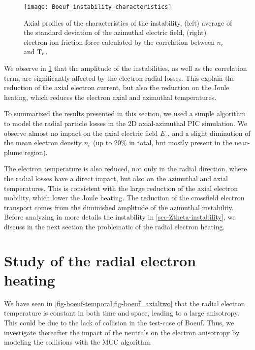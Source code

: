   \begin{figure}[!hbt]
    \centering
    \texttt{[image: Boeuf\_instability\_characteristics]}
    \caption{Axial profiles of the characteristics of the instability, (left) average of the standard deviation of the azimuthal electric field, (right) electron-ion friction force calculated by the correlation between $n_e$ and $\mathrm{T_e}$.    }
    \label{fig-boeuf-instability}
  \end{figure}

  
  We observe in \cref{fig-boeuf-instability} that the amplitude of the instabilities, as well as the correlation term, are significantly affected by the electron radial losses.
  This explain the reduction of the axial electron current, but also the reduction on the Joule heating, which reduces the electron axial and azimuthal temperatures.

  \vspace{1em}
  To summarized the results presented in this section, we used a simple algorithm to model the radial particle losses in the \ac{2D} axial-azimuthal \ac{PIC} simulation.
  We observe almost no impact on the axial electric field $E_z$, and a slight diminution of the mean electron density $n_e$ (up to 20\% in total, but mostly present in the near-plume region).
  
  The electron temperature is also reduced, not only in the radial direction, where the radial losses have a direct impact, but also on the azimuthal and axial temperatures.
  This is consistent with the large reduction of the axial electron mobility, which lower the Joule heating.
  The reduction of the crossfield electron transport comes from the diminished amplitude of the azimuthal instability.
  Before analyzing in more details the instability in \cref{sec-Ztheta-instability}, we discuss in the next section the problematic of the radial electron heating.


  \FloatBarrier
  \section{Study of the radial electron heating}
    We have seen in \cref{fig-boeuf-temporal,fig-boeuf_axialtwo} that the radial electron temperature is constant in both time and space, leading to a large anisotropy.
    This could be due to the lack of collision in the test-case of Boeuf.
    Thus, we investigate thereafter the impact of the neutrals on the electron anisotropy by modeling the collisions with the \ac{MCC} algorithm.
    

